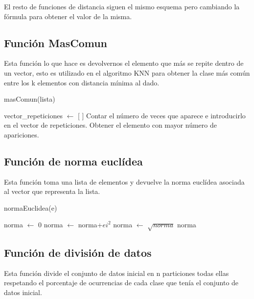 \documentclass[12pt,a4paper]{article}
\begin{document}
	El resto de funciones de distancia siguen el mismo esquema pero cambiando la fórmula para obtener el valor de la misma.

	\subsection{Función MasComun}

	Esta función lo que hace es devolvernos el elemento que más se repite dentro de un vector, esto es utilizado en el algoritmo KNN para obtener la clase más común entre los k elementos con distancia mínima al dado.

	\begin{algorithm}
		\caption{masComun(lista)}
		\begin{algorithmic}
			\STATE vector\_repeticiones $\leftarrow$ [ ]
				\STATE Contar el número de veces que aparece e introducirlo en el vector de repeticiones.
			\ENDFOR
			\STATE Obtener el elemento con mayor número de apariciones.
		\end{algorithmic}
	\end{algorithm}

	\subsection{Función de norma euclídea}

	Esta función toma una lista de elementos y devuelve la norma euclídea asociada al vector que representa la lista.

	\begin{algorithm}
		\caption{normaEuclidea(e)}
		\begin{algorithmic}
			\STATE norma $\leftarrow$ 0
			\FOR{ei en e}
				\STATE norma $\leftarrow$ norma+$ei^2$
			\ENDFOR
			\STATE norma $\leftarrow$ $\sqrt{norma}$
			\RETURN norma
		\end{algorithmic}
	\end{algorithm}

	\subsection{Función de división de datos}

	Esta función divide el conjunto de datos inicial en n particiones todas ellas respetando el porcentaje de ocurrencias de cada clase que tenía el conjunto de datos inicial.
\end{document}
